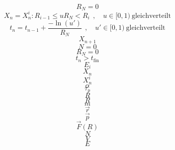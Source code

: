 \documentclass{scrreprt}
\begin{document}
\begin{equation}
R_N = 0
\end{equation}
\begin{equation}
  X_n = X_n^i : R_{i-1} \le u R_N < R_i ~~,\quad u \in [0,1)~\text{gleichverteilt}
\end{equation}
\begin{equation}
  t_n = t_{n-1} + \frac{-\ln(u')}{R_N} ~~,\quad u' \in [0,1)~\text{gleichverteilt}
\end{equation}
\begin{equation}
X_{n+1}
\end{equation}
\begin{equation}
N=0
\end{equation}
\begin{equation}
R_N=0
\end{equation}
\begin{equation}
t_n > t_\text{fin}
\end{equation}
\begin{equation}
E_i
\end{equation}
\begin{equation}
X_n
\end{equation}
\begin{equation}
X_n^i
\end{equation}
\begin{equation}
\alpha
\end{equation}
\begin{equation}
\tau_p
\end{equation}
\begin{equation}
R
\end{equation}
\begin{equation}
R
\end{equation}
\begin{equation}
m
\end{equation}
\begin{equation}
\vec r
\end{equation}
\begin{equation}
\vec p
\end{equation}
\begin{equation}
\vec{F}(R)
\end{equation}
\begin{equation}
N
\end{equation}
\begin{equation}
V
\end{equation}
\begin{equation}
E
\end{equation}
\end{document}
